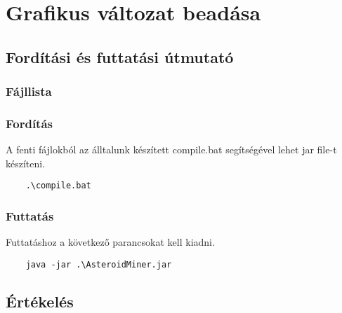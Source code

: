 \documentclass[../../projlab]{subfiles}
\begin{document}
\makeatletter


\makeatother


\chapter{Grafikus változat beadása}

\section{Fordítási és futtatási útmutató}

\subsection{Fájllista}

\begin{fajllista}
    
\end{fajllista}

\subsection{Fordítás}
A fenti fájlokból az álltalunk készített compile.bat segítségével lehet jar file-t készíteni.

\begin{verbatim}
    .\compile.bat
\end{verbatim}

\subsection{Futtatás}

Futtatáshoz a következő parancsokat kell kiadni.
\begin{verbatim}
    java -jar .\AsteroidMiner.jar
\end{verbatim}

\clearpage
\section{Értékelés}

\begin{ertekeles}
\end{ertekeles}
\end{document}

